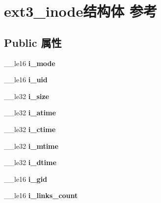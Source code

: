 \hypertarget{structext3__inode}{}\section{ext3\+\_\+inode结构体 参考}
\label{structext3__inode}
\subsection*{Public 属性}
\begin{DoxyCompactItemize}
\item 
\mbox{\label{structext3__inode_a526d42f424fb12acbc5dcfc6efc8d7bb}} 
\+\_\+\+\_\+le16 {\bfseries i\+\_\+mode}
\item 
\mbox{\label{structext3__inode_a35848e91fe6cfc7f901a7366aa98bae2}} 
\+\_\+\+\_\+le16 {\bfseries i\+\_\+uid}
\item 
\mbox{\label{structext3__inode_a1473ae4866c6c70fac1d5177bf6997db}} 
\+\_\+\+\_\+le32 {\bfseries i\+\_\+size}
\item 
\mbox{\label{structext3__inode_ac86f0970fafe39aae2ba4ea7a0e55e5a}} 
\+\_\+\+\_\+le32 {\bfseries i\+\_\+atime}
\item 
\mbox{\label{structext3__inode_a51d7b9a68ebc8c72ea9e1eb713557675}} 
\+\_\+\+\_\+le32 {\bfseries i\+\_\+ctime}
\item 
\mbox{\label{structext3__inode_acdae1685bceb3a68a75d4241535608a6}} 
\+\_\+\+\_\+le32 {\bfseries i\+\_\+mtime}
\item 
\mbox{\label{structext3__inode_af4afbb3ad224bb0ca4275fd677d8376a}} 
\+\_\+\+\_\+le32 {\bfseries i\+\_\+dtime}
\item 
\mbox{\label{structext3__inode_a28a0616e36f584cf8b4bef6609d7dca9}} 
\+\_\+\+\_\+le16 {\bfseries i\+\_\+gid}
\item 
\mbox{\label{structext3__inode_aec2791e4e1458c75cf35fd11fa20cdee}} 
\+\_\+\+\_\+le16 {\bfseries i\+\_\+links\+\_\+count}
\item 

\end{DoxyCompactItemize}
